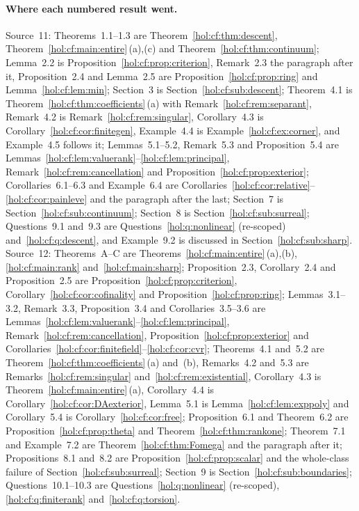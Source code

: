 \documentclass[11pt]{article}
\numberwithin{equation}{section}
\theoremstyle{definition}
\theoremstyle{remark}
\begin{document}
\paragraph{Where each numbered result went.}
Source~11: Theorems~1.1--1.3 are Theorem~\ref{hol:cf:thm:descent},
Theorem~\ref{hol:cf:main:entire}\,(a),(c) and
Theorem~\ref{hol:cf:thm:continuum}; Lemma~2.2 is
Proposition~\ref{hol:cf:prop:criterion}, Remark~2.3 the paragraph after it,
Proposition~2.4 and Lemma~2.5 are Proposition~\ref{hol:cf:prop:ring} and
Lemma~\ref{hol:cf:lem:min}; Section~3 is Section~\ref{hol:cf:sub:descent};
Theorem~4.1 is Theorem~\ref{hol:cf:thm:coefficients}\,(a) with
Remark~\ref{hol:cf:rem:separant}, Remark~4.2 is
Remark~\ref{hol:cf:rem:singular}, Corollary~4.3 is
Corollary~\ref{hol:cf:cor:finitegen}, Example~4.4 is
Example~\ref{hol:cf:ex:corner}, and Example~4.5 follows it;
Lemmas~5.1--5.2, Remark~5.3 and Proposition~5.4 are
Lemmas~\ref{hol:cf:lem:valuerank}--\ref{hol:cf:lem:principal},
Remark~\ref{hol:cf:rem:cancellation} and
Proposition~\ref{hol:cf:prop:exterior}; Corollaries~6.1--6.3 and Example~6.4
are Corollaries~\ref{hol:cf:cor:relative}--\ref{hol:cf:cor:painleve} and the
paragraph after the last; Section~7 is Section~\ref{hol:cf:sub:continuum};
Section~8 is Section~\ref{hol:cf:sub:surreal}; Questions~9.1 and~9.3 are
Questions~\ref{hol:q:nonlinear} (re-scoped) and~\ref{hol:cf:q:descent}, and
Example~9.2 is discussed in Section~\ref{hol:cf:sub:sharp}. Source~12:
Theorems~A--C are Theorems~\ref{hol:cf:main:entire}\,(a),(b),
\ref{hol:cf:main:rank} and~\ref{hol:cf:main:sharp}; Proposition~2.3,
Corollary~2.4 and Proposition~2.5 are
Proposition~\ref{hol:cf:prop:criterion}, Corollary~\ref{hol:cf:cor:cofinality}
and Proposition~\ref{hol:cf:prop:ring}; Lemmas~3.1--3.2, Remark~3.3,
Proposition~3.4 and Corollaries~3.5--3.6 are
Lemmas~\ref{hol:cf:lem:valuerank}--\ref{hol:cf:lem:principal},
Remark~\ref{hol:cf:rem:cancellation}, Proposition~\ref{hol:cf:prop:exterior}
and Corollaries~\ref{hol:cf:cor:finitefield}--\ref{hol:cf:cor:cvr};
Theorems~4.1 and~5.2 are Theorem~\ref{hol:cf:thm:coefficients}\,(a) and~(b),
Remarks~4.2 and~5.3 are Remarks~\ref{hol:cf:rem:singular}
and~\ref{hol:cf:rem:existential}, Corollary~4.3 is
Theorem~\ref{hol:cf:main:entire}\,(a), Corollary~4.4 is
Corollary~\ref{hol:cf:cor:DAexterior}, Lemma~5.1 is
Lemma~\ref{hol:cf:lem:exppoly} and Corollary~5.4 is
Corollary~\ref{hol:cf:cor:free}; Proposition~6.1 and Theorem~6.2 are
Proposition~\ref{hol:cf:prop:theta} and Theorem~\ref{hol:cf:thm:rankone};
Theorem~7.1 and Example~7.2 are Theorem~\ref{hol:cf:thm:Fomega} and the
paragraph after it; Propositions~8.1 and~8.2 are
Proposition~\ref{hol:cf:prop:scalar} and the whole-class failure of
Section~\ref{hol:cf:sub:surreal}; Section~9 is
Section~\ref{hol:cf:sub:boundaries}; Questions~10.1--10.3 are
Questions~\ref{hol:q:nonlinear} (re-scoped), \ref{hol:cf:q:finiterank}
and~\ref{hol:cf:q:torsion}.
\end{document}
